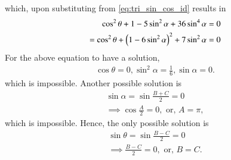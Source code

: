 \begin{enumerate}[label=\thesubsection.\arabic*.,ref=\thesubsection.\theenumi]
which, upon 
substituting from 
\eqref{eq:tri_sin_cos_id}
results in 
\begin{align}
	\cos^2 \theta + 1- 5\sin^2 \alpha  +36 \sin^4\alpha  = 0
	\\
	=
	\cos^2 \theta + \left(1- 6\sin^2 \alpha\right)^2  + 7\sin^2\alpha  = 0
\end{align}
For the above equation to have a solution, 
\begin{align}
	\cos \theta = 0, \sin^2\alpha = \frac{1}{6}, \sin \alpha = 0. 
\end{align}
which is impossible.  Another possible solution is 
\begin{align}
	\sin \alpha = \sin \frac{B+C}{2} = 0
	\\
	\implies \cos \frac{A}{2} = 0, \text{ or, }
	A = \pi, 
\end{align}
which is impossible.  Hence, the only possible solution is
\begin{align}
	\sin \theta = \sin \frac{B-C}{2} = 0
	\\
	\implies \frac{B-C}{2} =0, \text{ or, }
	B = C.
\end{align}
\end{enumerate}
